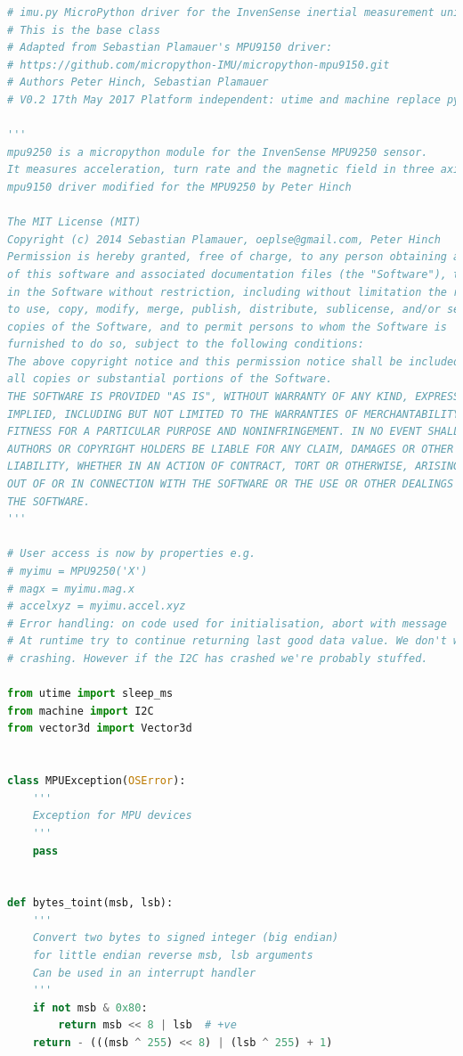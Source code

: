 \documentclass[conference]{IEEEtran}
\begin{document}
    \begin{lstlisting}[language=Python, caption=IMU Code, label=imu_code]
# imu.py MicroPython driver for the InvenSense inertial measurement units
# This is the base class
# Adapted from Sebastian Plamauer's MPU9150 driver:
# https://github.com/micropython-IMU/micropython-mpu9150.git
# Authors Peter Hinch, Sebastian Plamauer
# V0.2 17th May 2017 Platform independent: utime and machine replace pyb

'''
mpu9250 is a micropython module for the InvenSense MPU9250 sensor.
It measures acceleration, turn rate and the magnetic field in three axis.
mpu9150 driver modified for the MPU9250 by Peter Hinch

The MIT License (MIT)
Copyright (c) 2014 Sebastian Plamauer, oeplse@gmail.com, Peter Hinch
Permission is hereby granted, free of charge, to any person obtaining a copy
of this software and associated documentation files (the "Software"), to deal
in the Software without restriction, including without limitation the rights
to use, copy, modify, merge, publish, distribute, sublicense, and/or sell
copies of the Software, and to permit persons to whom the Software is
furnished to do so, subject to the following conditions:
The above copyright notice and this permission notice shall be included in
all copies or substantial portions of the Software.
THE SOFTWARE IS PROVIDED "AS IS", WITHOUT WARRANTY OF ANY KIND, EXPRESS OR
IMPLIED, INCLUDING BUT NOT LIMITED TO THE WARRANTIES OF MERCHANTABILITY,
FITNESS FOR A PARTICULAR PURPOSE AND NONINFRINGEMENT. IN NO EVENT SHALL THE
AUTHORS OR COPYRIGHT HOLDERS BE LIABLE FOR ANY CLAIM, DAMAGES OR OTHER
LIABILITY, WHETHER IN AN ACTION OF CONTRACT, TORT OR OTHERWISE, ARISING FROM,
OUT OF OR IN CONNECTION WITH THE SOFTWARE OR THE USE OR OTHER DEALINGS IN
THE SOFTWARE.
'''

# User access is now by properties e.g.
# myimu = MPU9250('X')
# magx = myimu.mag.x
# accelxyz = myimu.accel.xyz
# Error handling: on code used for initialisation, abort with message
# At runtime try to continue returning last good data value. We don't want aircraft
# crashing. However if the I2C has crashed we're probably stuffed.

from utime import sleep_ms
from machine import I2C
from vector3d import Vector3d


class MPUException(OSError):
    '''
    Exception for MPU devices
    '''
    pass


def bytes_toint(msb, lsb):
    '''
    Convert two bytes to signed integer (big endian)
    for little endian reverse msb, lsb arguments
    Can be used in an interrupt handler
    '''
    if not msb & 0x80:
        return msb << 8 | lsb  # +ve
    return - (((msb ^ 255) << 8) | (lsb ^ 255) + 1)



\end{lstlisting}
\end{document}

